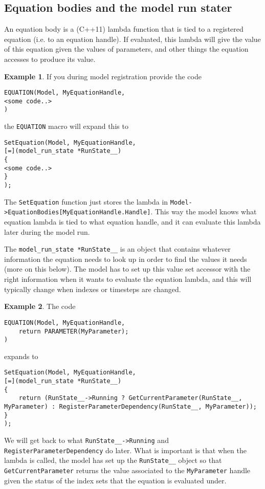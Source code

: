 \documentclass[11pt]{article}
\theoremstyle{definition}
\newtheorem{myexample}{Example}
\newenvironment{example}%
  {\begin{lrbox}{\examplebox}%
   \begin{minipage}{\dimexpr\linewidth-2\fboxsep}
   \begin{myexample}}%
  {\end{myexample}%
   \end{minipage}%
   \end{lrbox}%
   \begin{trivlist}
     \item[]\colorbox{silver}{\usebox\examplebox}
   \end{trivlist}}
\begin{document}
\subsection{Equation bodies and the model run stater}

An equation body is a (C++11) lambda function that is tied to a registered equation (i.e. to an equation handle). If evaluated, this lambda will give the value of this equation given the values of parameters, and other things the equation accesses to produce its value.

\begin{example}
If you during model registration provide the code
\begin{lstlisting}[style=mycpp]
EQUATION(Model, MyEquationHandle,
<some code..>
)
\end{lstlisting}
the {\tt EQUATION} macro will expand this to
\begin{lstlisting}[style=mycpp]
SetEquation(Model, MyEquationHandle,
[=](model_run_state *RunState__)
{
<some code..>
}
);
\end{lstlisting}
\end{example}
The {\tt SetEquation} function just stores the lambda in {\tt Model->EquationBodies[MyEquationHandle.Handle]}. This way the model knows what equation lambda is tied to what equation handle, and it can evaluate this lambda later during the model run.

The {\tt model\_run\_state *RunState\_\_} is an object that contains whatever information the equation needs to look up in order to find the values it needs (more on this below). The model has to set up this value set accessor with the right information when it wants to evaluate the equation lambda, and this will typically change when indexes or timesteps are changed.

\begin{example}
The code
\begin{lstlisting}[style=mycpp]
EQUATION(Model, MyEquationHandle,
	return PARAMETER(MyParameter);
)
\end{lstlisting}
expands to
\begin{lstlisting}[style=mycpp]
SetEquation(Model, MyEquationHandle,
[=](model_run_state *RunState__)
{
	return (RunState__->Running ? GetCurrentParameter(RunState__, MyParameter) : RegisterParameterDependency(RunState__, MyParameter));
}
);
\end{lstlisting}
\end{example}
We will get back to what {\tt RunState\_\_->Running} and {\tt RegisterParameterDependency} do later. What is important is that when the lambda is called, the model has set up the {\tt RunState\_\_} object so that {\tt GetCurrentParameter} returns the value associated to the {\tt MyParameter} handle given the status of the index sets that the equation is evaluated under.
\end{document}
